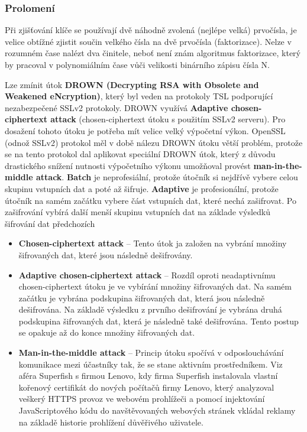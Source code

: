 \documentclass[12pt, a4paper]{article}
\begin{document}
		\subsubsection{Prolomení}
		Při zjišťování klíče se používají dvě náhodně zvolená (nejlépe velká) prvočísla, je velice obtížné zjistit součin velkého čísla na dvě prvočísla (faktorizace). Nelze v rozumném čase nalézt dva činitele, neboť není znám algoritmus faktorizace, který by pracoval v polynomiálním čase vůči velikosti binárního zápisu čísla N.
		\par
		Lze zmínit útok \textbf{DROWN (Decrypting RSA with Obsolete and Weakened eNcryption)}, který byl veden na protokoly TSL podporující nezabezpečené SSLv2 protokoly. DROWN využívá \textbf{Adaptive chosen-ciphertext attack} (chosen-ciphertext útoku s použitím SSLv2 serveru). Pro dosažení tohoto útoku je potřeba mít velice velký výpočetní výkon. OpenSSL (odnož SSLv2) protokol měl v době nálezu DROWN útoku větší problém, protože se na tento protokol dal aplikovat speciální DROWN útok, který z důvodu drastického snížení nutnosti výpočetního výkonu umožňoval provést \textbf{man-in-the-middle attack}.
\textbf{Batch} je neprofesiální, protože útočník si nejdřívě vybere celou skupinu vstupních dat a poté až šifruje. \textbf{Adaptive} je profesionální, protože útočník na samém začátku vybere část vstupních dat, které nechá zašifrovat. Po zašifrování vybírá další menší skupinu vstupních dat na základe výsledků šifrování dat předchozích
			\begin{itemize}
			 \item \textbf{Chosen-ciphertext attack} -- Tento útok ja založen na vybrání množiny šifrovaných dat, které jsou následně dešifrovány.
			 \item \textbf{Adaptive chosen-ciphertext attack} -- Rozdíl oproti neadaptivnímu chosen-ciphertext útoku je ve vybírání množiny šifrovaných dat. Na samém začátku je vybrána podskupina šifrovaných dat, která jsou následně dešifrována. Na základě výsledku z prvního dešifrování je vybrána druhá podskupina šifrovaných dat, která je následně také dešifrována. Tento postup se opakuje až do konce množiny šifrovaných dat.
			 \item \textbf{Man-in-the-middle attack} -- Princip útoku spočívá v odposlouchávání komunikace mezi účastníky tak, že se stane aktivním prostředníkem. Viz aféra Superfish s firmou Lenovo, kdy firma Superfish instalovala vlastní kořenový certifikát do nových počítačů firmy Lenovo, který analyzoval veškerý HTTPS provoz ve webovém prohlížeči a pomocí injektování JavaScriptového kódu do navštěvovaných webových stránek vkládal reklamy na základě historie prohlížení důvěřivého uživatele.
			\end{itemize}
\end{document}
